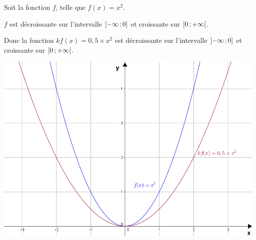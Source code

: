 \documentclass[12pt,a4paper]{article}
\begin{document}
\begin{myex}
		
		Soit la fonction $f$, telle que $f(x) = x^2$.
		
		$f$ est décroissante sur l'intervalle $\mbox{\ensuremath{\left]-\infty\mathpunct{};0\right]}} $ et croissante sur $\mbox{\ensuremath{\left[0\mathpunct{};+\infty\right[}}$.
		
		Donc la fonction $kf(x) = 0,5 \times x^2$ est décroissante sur l'intervalle $\mbox{\ensuremath{\left]-\infty\mathpunct{};0\right]}} $ et croissante sur $\mbox{\ensuremath{\left[0\mathpunct{};+\infty\right[}}$.
		
		\begin{center}
			\includegraphics[scale=0.6]{./img/kf1}			
		\end{center}

\end{myex}
\end{document}
